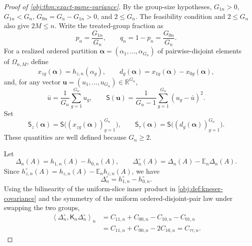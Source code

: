\documentclass[11pt]{article}
\begin{document}
\begin{proof}[Proof of \cref{obj:thm:exact-pame-variance}]
By the group-size hypotheses, \(G_{1n}>0\), \(G_{1n}<G_n\), \(G_{0n}=G_n-G_{1n}>0\), and \(2\le G_n\). The feasibility condition and \(2\le G_n\) also give \(2M\le n\). Write the treated-group fraction as
\[
p_n=\frac{G_{1n}}{G_n},
\qquad
q_n=1-p_n=\frac{G_{0n}}{G_n}.
\]
For a realized ordered partition
\(\boldsymbol\alpha=(\alpha_1,\ldots,\alpha_{G_n})\) of pairwise-disjoint elements of
\(\Omega_{n,M}\), define
\[
x_{zg}(\boldsymbol\alpha)=h_{z,n}(\alpha_g),\qquad
d_g(\boldsymbol\alpha)=x_{1g}(\boldsymbol\alpha)-x_{0g}(\boldsymbol\alpha),
\]
and, for any vector \(\mathbf u=(u_1,\ldots,u_{G_n})\in\mathbb R^{G_n}\),
\[
\bar u=\frac1{G_n}\sum_{g=1}^{G_n}u_g,
\qquad
\mathsf S(\mathbf u)=\frac1{G_n-1}\sum_{g=1}^{G_n}(u_g-\bar u)^2 .
\]
Set
\[
\mathsf S_z(\boldsymbol\alpha)=\mathsf S\bigl((x_{zg}(\boldsymbol\alpha))_{g=1}^{G_n}\bigr),
\qquad
\mathsf S_\tau(\boldsymbol\alpha)=\mathsf S\bigl((d_g(\boldsymbol\alpha))_{g=1}^{G_n}\bigr).
\]
These quantities are well defined because \(G_n\ge2\). %

Let
\[
\Delta_n(A)=h_{1,n}(A)-h_{0,n}(A),
\qquad
\Delta_n^\circ(A)=\Delta_n(A)-\mathbb E_n\Delta_n(A).
\]
Since \(h_{z,n}^\circ(A)=h_{z,n}(A)-\mathbb E_n h_{z,n}(A)\), we have
\[
\Delta_n^\circ=h_{1,n}^\circ-h_{0,n}^\circ .
\]
Using the bilinearity of the uniform-slice inner product in \cref{obj:def:kneser-covariance} and the symmetry of the uniform ordered-disjoint-pair law under swapping the two groups,
\[
\begin{aligned}
\left\langle \Delta_n^\circ,\mathsf K_n\Delta_n^\circ\right\rangle_n
&=
C_{11,n}+C_{00,n}-C_{10,n}-C_{01,n}  \\
&=
C_{11,n}+C_{00,n}-2C_{10,n}
=
C_{\tau\tau,n}.
\end{aligned}
\]


\end{proof}
\end{document}
